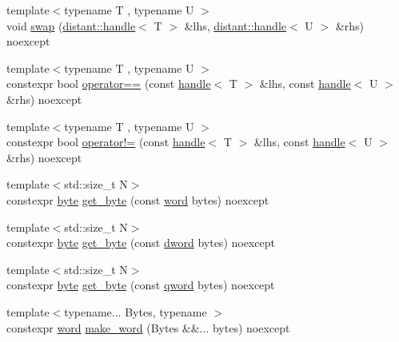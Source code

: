 \begin{DoxyCompactItemize}
\item 
{\footnotesize template$<$typename T , typename U $>$ }\\void \mbox{\hyperlink{namespacedistant_aa07e5630aa553dd96069e86f8e64ad8c}{swap}} (\mbox{\hyperlink{classdistant_1_1handle}{distant\+::handle}}$<$ T $>$ \&lhs, \mbox{\hyperlink{classdistant_1_1handle}{distant\+::handle}}$<$ U $>$ \&rhs) noexcept
\item 
{\footnotesize template$<$typename T , typename U $>$ }\\constexpr bool \mbox{\hyperlink{namespacedistant_af50e6271bb4ffe13138b5352bf76aaa6}{operator==}} (const \mbox{\hyperlink{classdistant_1_1handle}{handle}}$<$ T $>$ \&lhs, const \mbox{\hyperlink{classdistant_1_1handle}{handle}}$<$ U $>$ \&rhs) noexcept
\item 
{\footnotesize template$<$typename T , typename U $>$ }\\constexpr bool \mbox{\hyperlink{namespacedistant_abb1f45c54df20dd0b1ad63d292155e50}{operator!=}} (const \mbox{\hyperlink{classdistant_1_1handle}{handle}}$<$ T $>$ \&lhs, const \mbox{\hyperlink{classdistant_1_1handle}{handle}}$<$ U $>$ \&rhs) noexcept
\item 
{\footnotesize template$<$std\+::size\+\_\+t N$>$ }\\constexpr \mbox{\hyperlink{namespacedistant_af9c3f04a9b855a1368d6c1a9ce28c2f4}{byte}} \mbox{\hyperlink{namespacedistant_a0f9ebb6f0a15b607a7b15ecbeb6af958}{get\+\_\+byte}} (const \mbox{\hyperlink{namespacedistant_a615d26c8218c108ba83dfea768c0e130}{word}} bytes) noexcept
\item 
{\footnotesize template$<$std\+::size\+\_\+t N$>$ }\\constexpr \mbox{\hyperlink{namespacedistant_af9c3f04a9b855a1368d6c1a9ce28c2f4}{byte}} \mbox{\hyperlink{namespacedistant_aa9bd72cd14756eceba7009980b84e19a}{get\+\_\+byte}} (const \mbox{\hyperlink{namespacedistant_a9fa41a5a1a17dcbd24da1c1855c92489}{dword}} bytes) noexcept
\item 
{\footnotesize template$<$std\+::size\+\_\+t N$>$ }\\constexpr \mbox{\hyperlink{namespacedistant_af9c3f04a9b855a1368d6c1a9ce28c2f4}{byte}} \mbox{\hyperlink{namespacedistant_a109646e8e7f0c98fefc2ff6a07c28717}{get\+\_\+byte}} (const \mbox{\hyperlink{namespacedistant_ac5f83107c559f04950d4c9fa5464364e}{qword}} bytes) noexcept
\item 
{\footnotesize template$<$typename... Bytes, typename $>$ }\\constexpr \mbox{\hyperlink{namespacedistant_a615d26c8218c108ba83dfea768c0e130}{word}} \mbox{\hyperlink{namespacedistant_a63d7f946dda0bcc5e590010a634f3285}{make\+\_\+word}} (Bytes \&\&... bytes) noexcept

\end{DoxyCompactItemize}

